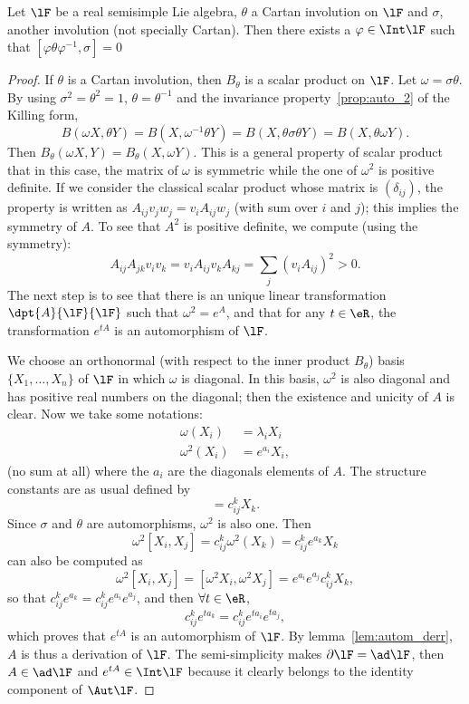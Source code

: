 \begin{theorem}
Let $\lF$ be a real semisimple Lie algebra, $\theta$ a Cartan involution on $\lF$ and $\sigma$, another involution (not specially Cartan). Then there exists a $\varphi\in\Int\lF$ such that $[\varphi\theta\varphi^{-1},\sigma]=0$
\label{tho:sigma_theta_un}
\end{theorem}

\begin{proof}
If $\theta$ is a Cartan involution, then $B_{\theta}$ is a scalar product on $\lF$. Let $\omega=\sigma\theta$. By using $\sigma^2=\theta^2=1$, $\theta=\theta^{-1}$ and the invariance property~\ref{prop:auto_2} of the Killing form,
\begin{equation}
B(\omega X,\theta Y)=B(X,\omega^{-1}\theta Y)
                    =B(X,\theta\sigma\theta Y)
            =B(X,\theta\omega Y).
\end{equation}
Then $B_{\theta}(\omega X,Y)=B_{\theta}(X,\omega Y)$. This is a general property of scalar product that in this case, the matrix of $\omega$ is symmetric while the one of $\omega^2$ is positive definite. If we consider the classical scalar product whose matrix is $(\delta_{ij})$, the property is written as $A_{ij}v_jw_j=v_iA_{ij}w_j$ (with sum over $i$ and $j$); this implies the symmetry of $A$. To see that $A^2$ is positive definite, we compute (using the symmetry):
\[
   A_{ij}A_{jk}v_iv_k=v_iA_{ij}v_kA_{kj}=\sum_j(v_iA_{ij})^2>0.
\]
The next step is to see that there is an unique linear transformation $\dpt{A}{\lF}{\lF}$ such that $\omega^2=e^A$, and that for any $t\in\eR$, the transformation $e^{tA}$ is an automorphism of $\lF$.

We choose an orthonormal (with respect to the inner product $B_{\theta}$) basis $\{X_1,\ldots,X_n\}$  of $\lF$ in which $\omega$ is diagonal. In this basis, $\omega^2$ is also diagonal and has positive real numbers on the diagonal; then the existence and unicity of $A$ is clear. Now we take some notations:
\begin{subequations}
\begin{align}
  \omega(X_i)&=\lambda_iX_i\\
  \omega^2(X_i)&=e^{a_i}X_i,
\end{align}
\end{subequations}
(no sum at all) where the $a_i$ are the diagonals elements of $A$. The structure constants are as usual defined by
\begin{equation}
   [X_i,X_j]=c_{ij}^kX_k.
\end{equation}
Since $\sigma$ and $\theta$ are automorphisms, $\omega^2$ is also one. Then
\[
\omega^2[X_i,X_j]=c_{ij}^k\omega^2(X_k)=c_{ij}^ke^{a_k}X_k
\]
can also be computed as
\[
   \omega^2[X_i,X_j]=[\omega^2X_i,\omega^2X_j]=e^{a_i}e^{a_j}c_{ij}^kX_k,
\]
so that $c_{ij}^ke^{a_k}=c_{ij}^ke^{a_i}e^{a_j}$, and then $\forall t\in\eR$,
\[
   c_{ij}^ke^{ta_k}=c_{ij}^ke^{ta_i}e^{ta_j},
\]
which proves that $e^{tA}$ is an automorphism of $\lF$. By lemma~\ref{lem:autom_derr}, $A$ is thus a derivation of $\lF$. The semi-simplicity makes $\partial\lF=\ad\lF$, then $A\in\ad\lF$ and $e^{tA}\in\Int\lF$ because it clearly belongs to the identity component of $\Aut\lF$.


\end{proof}
